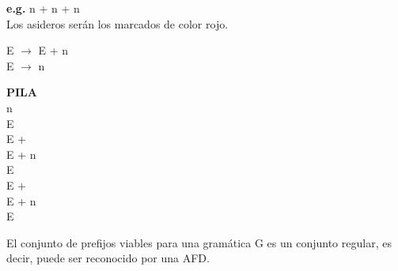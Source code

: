 \documentclass[\main/ApuntesPL.tex]{subfiles}
\begin{document}
    \bigskip
    \par
    \textbf{e.g.} n + n + n\\
    Los asideros serán los marcados de color {\color{red}rojo}.
    \begin{center}
      \begin{minipage}{.2\textwidth}
        \hspace*{5mm}E $\rightarrow$ E + n\\
        \hspace*{5mm}E $\rightarrow$ n\\
      \end{minipage}%
      \begin{minipage}{.2\textwidth}
        \begin{flushright}
          \textbf{PILA}\\
          {\color{red}n}\\
          E\\
          E +\\
          {\color{red}E + n}\\
          E\\
          E +\\
          {\color{red}E + n}\\
          E
        \end{flushright}
      \end{minipage}%
      \begin{minipage}{.5\textwidth}
      \end{minipage}
    \end{center}

    \bigskip
    \par
    El conjunto de prefijos viables para una gramática G es un conjunto regular,
    es decir, puede ser reconocido por una AFD.

\end{document}
